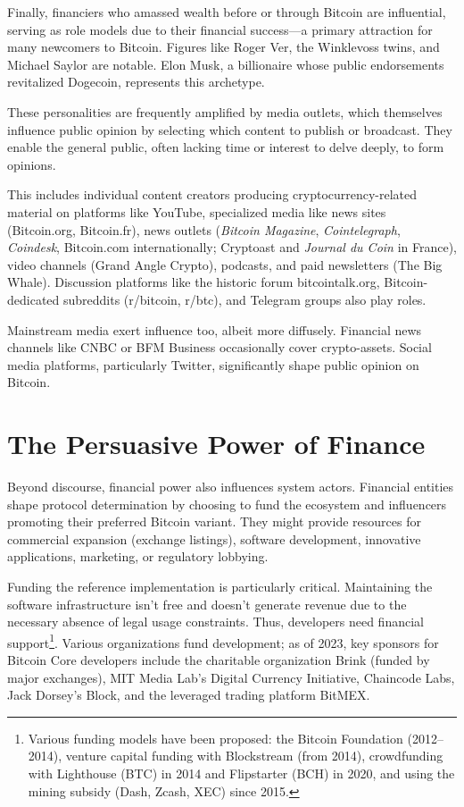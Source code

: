\documentclass[
  a5paper,
  smalldemyvopaper,10pt,twoside,onecolumn,openright,extrafontsizes,hidelinks]{memoir}
\begin{document}
Finally, financiers who amassed wealth before or through Bitcoin are
influential, serving as role models due to their financial success---a
primary attraction for many newcomers to Bitcoin. Figures like Roger
Ver, the Winklevoss twins, and Michael Saylor are notable. Elon Musk, a
billionaire whose public endorsements revitalized Dogecoin, represents
this archetype.

These personalities are frequently amplified by media outlets, which
themselves influence public opinion by selecting which content to
publish or broadcast. They enable the general public, often lacking time
or interest to delve deeply, to form opinions.

This includes individual content creators producing
cryptocurrency-related material on platforms like YouTube, specialized
media like news sites (Bitcoin.org, Bitcoin.fr), news outlets
(\emph{Bitcoin Magazine}, \emph{Cointelegraph}, \emph{Coindesk},
Bitcoin.com internationally; Cryptoast and \emph{Journal du Coin} in
France), video channels (Grand Angle Crypto), podcasts, and paid
newsletters (The Big Whale). Discussion platforms like the historic
forum bitcointalk.org, Bitcoin-dedicated subreddits (r/bitcoin, r/btc),
and Telegram groups also play roles.

Mainstream media exert influence too, albeit more diffusely. Financial
news channels like CNBC or BFM Business occasionally cover
crypto-assets. Social media platforms, particularly Twitter,
significantly shape public opinion on Bitcoin.

\section*{The Persuasive Power of
Finance}\label{the-persuasive-power-of-finance}


Beyond discourse, financial power also influences system actors.
Financial entities shape protocol determination by choosing to fund the
ecosystem and influencers promoting their preferred Bitcoin variant.
They might provide resources for commercial expansion (exchange
listings), software development, innovative applications, marketing, or
regulatory lobbying.

Funding the reference implementation is particularly critical.
Maintaining the software infrastructure isn't free and doesn't generate
revenue due to the necessary absence of legal usage constraints. Thus,
developers need financial support\footnote{Various funding models have
  been proposed: the Bitcoin Foundation (2012--2014), venture capital
  funding with Blockstream (from 2014), crowdfunding with Lighthouse
  (BTC) in 2014 and Flipstarter (BCH) in 2020, and using the mining
  subsidy (Dash, Zcash, XEC) since 2015.}. Various organizations fund
development; as of 2023, key sponsors for Bitcoin Core developers
include the charitable organization Brink (funded by major exchanges),
MIT Media Lab's Digital Currency Initiative, Chaincode Labs, Jack
Dorsey's Block, and the leveraged trading platform BitMEX.
\end{document}
